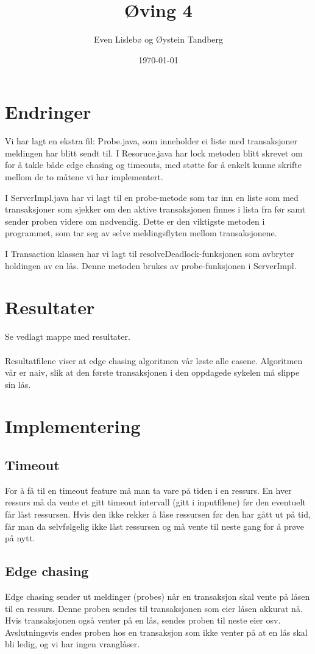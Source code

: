 \documentclass{article}
\begin{document}
\title{Øving 4}
\author{Even Lislebø og Øystein Tandberg}
\date{\today}
\maketitle

\section*{Endringer}
Vi har lagt en ekstra fil: Probe.java, som inneholder ei liste med transaksjoner meldingen har blitt sendt til.
I Resoruce.java har lock metoden blitt skrevet om for å takle både edge chasing og timeouts, med støtte for å enkelt kunne skrifte mellom de to måtene vi har implementert. 

I ServerImpl.java har vi lagt til en probe-metode som tar inn en liste som med transaksjoner som sjekker om den aktive transaksjonen finnes i lista fra før samt sender proben videre om nødvendig. Dette er den viktigste metoden i programmet, som tar seg av selve meldingsflyten mellom transaksjonene.

I Transaction klassen har vi lagt til resolveDeadlock-funksjonen som avbryter holdingen av en lås. Denne metoden brukes av probe-funksjonen i ServerImpl. 


\section*{Resultater}
Se vedlagt mappe med resultater. \\ \\
Resultatfilene viser at edge chasing algoritmen vår løste alle casene. Algoritmen vår er naiv, slik at den første transaksjonen i den oppdagede sykelen må slippe sin lås.

\section*{Implementering}
\subsection*{Timeout}
For å få til en timeout feature må man ta vare på tiden i en ressurs. En hver ressurs må da vente et gitt timeout intervall (gitt i inputfilene) før den eventuelt får låst ressursen. Hvis den ikke rekker å låse ressursen før den har gått ut på tid, får man da selvfølgelig ikke låst ressursen og må vente til neste gang for å prøve på nytt.

\subsection*{Edge chasing}
Edge chasing sender ut meldinger (probes) når en transaksjon skal vente på låsen til en ressurs. Denne proben sendes til transaksjonen som eier låsen akkurat nå. Hvis transaksjonen også venter på en lås, sendes proben til neste eier osv. Avslutningsvis endes proben hos en transaksjon som ikke venter på at en lås skal bli ledig, og vi har ingen vranglåser.
\end{document}
